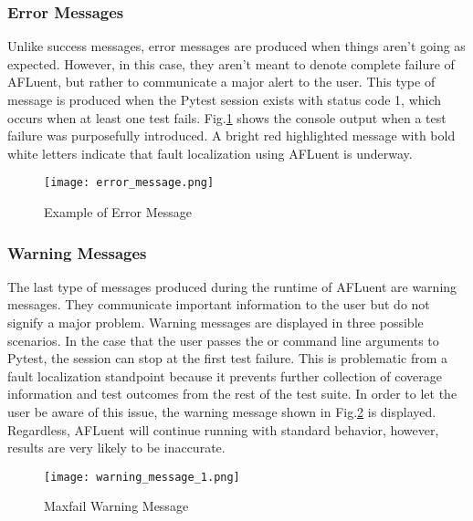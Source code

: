\subsubsection{Error Messages}
\label{subsubsec:error_message}

Unlike success messages, error messages are produced when things aren't going as
expected. However, in this case, they aren't meant to denote complete failure of
AFLuent, but rather to communicate a major alert to the user. This type of
message is produced when the Pytest session exists with status code 1, which
occurs when at least one test fails. Fig.\ref{fig:error_message} shows the
console output when a test failure was purposefully introduced. A bright red
highlighted message with bold white letters indicate that fault localization
using AFLuent is underway.

\begin{figure}[!htb]
	\begin{center}
		\texttt{[image: error\_message.png]}
		\caption{\label{fig:error_message} Example of Error Message}
	\end{center}
\end{figure}

\subsubsection{Warning Messages}
\label{subsubsec:warning_message}

The last type of messages produced during the runtime of AFLuent are warning
messages. They communicate important information to the user but do not signify
a major problem. Warning messages are displayed in three possible scenarios. In
the case that the user passes the  or  command line
arguments to Pytest, the session can stop at the first test failure. This is
problematic from a fault localization standpoint because it prevents further
collection of coverage information and test outcomes from the rest of the test
suite. In order to let the user be aware of this issue, the warning message
shown in Fig.\ref{fig:warning_message_1} is displayed. Regardless, AFLuent will
continue running with standard behavior, however, results are very likely to be
inaccurate.

\begin{figure}[!htb]
	\begin{center}
		\texttt{[image: warning\_message\_1.png]}
		\caption{\label{fig:warning_message_1} Maxfail Warning Message}
	\end{center}
\end{figure}

